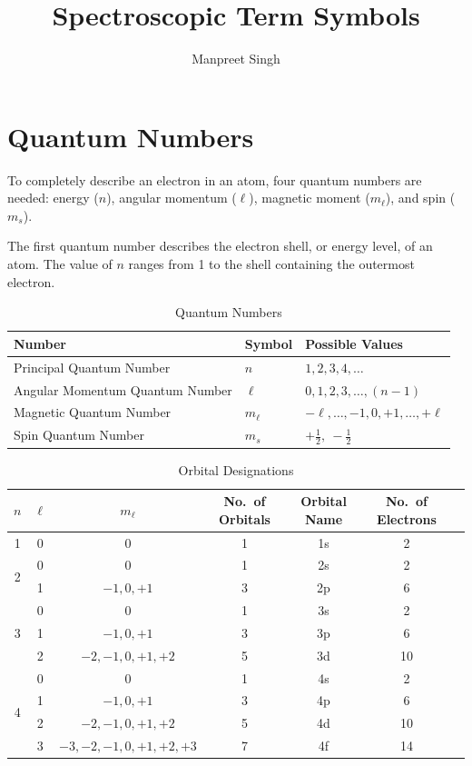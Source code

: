 \documentclass[12pt,a4paper]{article}
\title{\textbf{Spectroscopic Term Symbols}}
\author{Manpreet Singh}
\date{}
\begin{document}
\maketitle
\tableofcontents
\newpage

\section{Quantum Numbers}

To completely describe an electron in an atom, four quantum numbers are needed: energy ($n$), angular momentum ($\ell$), magnetic moment ($m_\ell$), and spin ($m_s$).

The first quantum number describes the electron shell, or energy level, of an atom. The value of $n$ ranges from 1 to the shell containing the outermost electron.

\begin{table}[H]
\centering
\caption{Quantum Numbers}
\begin{tabular}{lll}
\toprule
\textbf{Number} & \textbf{Symbol} & \textbf{Possible Values} \\
\midrule
Principal Quantum Number & $n$ & $1, 2, 3, 4, \ldots$ \\
Angular Momentum Quantum Number & $\ell$ & $0, 1, 2, 3, \ldots, (n-1)$ \\
Magnetic Quantum Number & $m_\ell$ & $-\ell, \ldots, -1, 0, +1, \ldots, +\ell$ \\
Spin Quantum Number & $m_s$ & $+\tfrac{1}{2},\ -\tfrac{1}{2}$ \\
\bottomrule
\end{tabular}
\end{table}

\begin{table}[H]
\centering
\caption{Orbital Designations}
\begin{tabular}{ccccccc}
\toprule
$n$ & $\ell$ & $m_\ell$ & \textbf{No.\ of Orbitals} & \textbf{Orbital Name} & \textbf{No.\ of Electrons} \\
\midrule
1 & 0 & 0 & 1 & 1s & 2 \\
\midrule
\multirow{2}{*}{2} & 0 & 0 & 1 & 2s & 2 \\
 & 1 & $-1, 0, +1$ & 3 & 2p & 6 \\
\midrule
\multirow{3}{*}{3} & 0 & 0 & 1 & 3s & 2 \\
 & 1 & $-1, 0, +1$ & 3 & 3p & 6 \\
 & 2 & $-2,-1,0,+1,+2$ & 5 & 3d & 10 \\
\midrule
\multirow{4}{*}{4} & 0 & 0 & 1 & 4s & 2 \\
 & 1 & $-1,0,+1$ & 3 & 4p & 6 \\
 & 2 & $-2,-1,0,+1,+2$ & 5 & 4d & 10 \\
 & 3 & $-3,-2,-1,0,+1,+2,+3$ & 7 & 4f & 14 \\
\bottomrule
\end{tabular}
\end{table}
\end{document}
